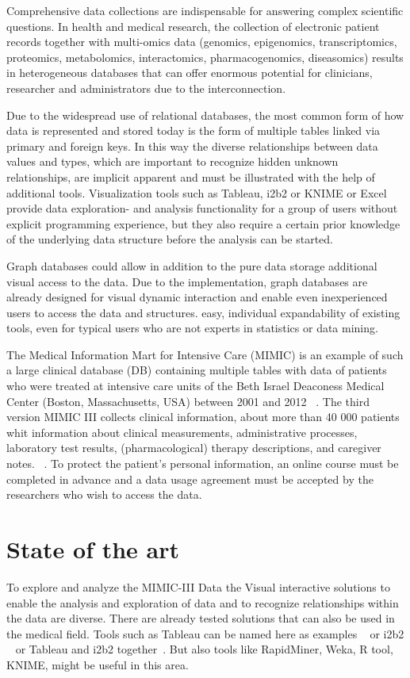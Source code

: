 Comprehensive data collections are indispensable for answering complex scientific questions. In health and medical research, the collection of electronic patient records together with multi-omics data (genomics, epigenomics, transcriptomics, proteomics, metabolomics, interactomics, pharmacogenomics, diseasomics) results in heterogeneous databases that can offer enormous potential for clinicians, researcher and administrators due to the interconnection. 

Due to the widespread use of relational databases, the most common form of how data is represented and stored today is the form of multiple tables linked via primary and foreign keys. In this way the diverse relationships between data values and types, which are important to recognize hidden unknown relationships, are implicit apparent and must be illustrated with the help of additional tools. Visualization tools such as Tableau, i2b2 or KNIME or Excel provide data exploration- and analysis functionality for a group of users without explicit programming experience, but they also require a certain prior knowledge of the underlying data structure before the analysis can be started. 

Graph databases could allow in addition to the pure data storage additional visual access to the data. Due to the implementation, graph databases are already designed for visual dynamic interaction and enable even inexperienced users to access the data and structures. easy, individual expandability of existing tools, even for typical users who are not experts in statistics or data mining. 

The Medical Information Mart for Intensive Care (MIMIC) is an example of such a large clinical database (DB) containing multiple tables with data of patients who were treated at intensive care units of the Beth Israel Deaconess Medical Center (Boston, Massachusetts, USA) between 2001 and 2012 ~\cite{Johnson.2016}. The third version MIMIC III collects clinical information, about more than 40 000 patients whit information about clinical measurements, administrative processes, laboratory test results, (pharmacological) therapy descriptions, and caregiver notes. ~\cite{Johnson.2016}. To protect the patient's personal information, an online course must be completed in advance and a data usage agreement must be accepted by the researchers who wish to access the data.


\section{State of the art}\label{s2}
To explore and analyze the MIMIC-III Data the 
Visual interactive solutions to enable the analysis and exploration of data and to recognize relationships within the data are diverse. There are already tested solutions that can also be used in the medical field. Tools such as Tableau can be named here as examples ~\cite{Ko.2017} or i2b2 ~\cite{Murphy.2014} or Tableau and i2b2 together~\cite{Harris.2016}. But also tools like RapidMiner, Weka, R tool, KNIME, might be useful in this area. \cite{Dwivedi.18.03.201619.03.2016}


